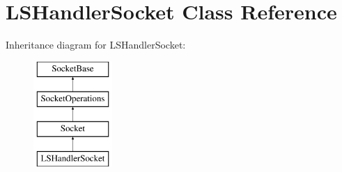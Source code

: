 \hypertarget{classLSHandlerSocket}{
\section{LSHandlerSocket Class Reference}
\label{classLSHandlerSocket}
}
Inheritance diagram for LSHandlerSocket:\begin{figure}[H]
\begin{center}
\leavevmode
\includegraphics[height=4.000000cm]{classLSHandlerSocket}
\end{center}
\end{figure}
